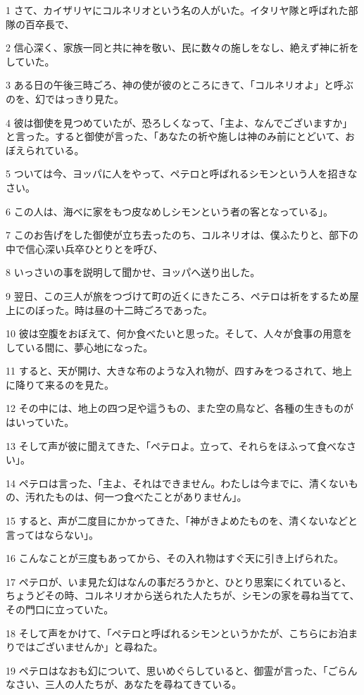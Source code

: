 \par 1 さて、カイザリヤにコルネリオという名の人がいた。イタリヤ隊と呼ばれた部隊の百卒長で、
\par 2 信心深く、家族一同と共に神を敬い、民に数々の施しをなし、絶えず神に祈をしていた。
\par 3 ある日の午後三時ごろ、神の使が彼のところにきて、「コルネリオよ」と呼ぶのを、幻ではっきり見た。
\par 4 彼は御使を見つめていたが、恐ろしくなって、「主よ、なんでございますか」と言った。すると御使が言った、「あなたの祈や施しは神のみ前にとどいて、おぼえられている。
\par 5 ついては今、ヨッパに人をやって、ペテロと呼ばれるシモンという人を招きなさい。
\par 6 この人は、海べに家をもつ皮なめしシモンという者の客となっている」。
\par 7 このお告げをした御使が立ち去ったのち、コルネリオは、僕ふたりと、部下の中で信心深い兵卒ひとりとを呼び、
\par 8 いっさいの事を説明して聞かせ、ヨッパへ送り出した。
\par 9 翌日、この三人が旅をつづけて町の近くにきたころ、ペテロは祈をするため屋上にのぼった。時は昼の十二時ごろであった。
\par 10 彼は空腹をおぼえて、何か食べたいと思った。そして、人々が食事の用意をしている間に、夢心地になった。
\par 11 すると、天が開け、大きな布のような入れ物が、四すみをつるされて、地上に降りて来るのを見た。
\par 12 その中には、地上の四つ足や這うもの、また空の鳥など、各種の生きものがはいっていた。
\par 13 そして声が彼に聞えてきた、「ペテロよ。立って、それらをほふって食べなさい」。
\par 14 ペテロは言った、「主よ、それはできません。わたしは今までに、清くないもの、汚れたものは、何一つ食べたことがありません」。
\par 15 すると、声が二度目にかかってきた、「神がきよめたものを、清くないなどと言ってはならない」。
\par 16 こんなことが三度もあってから、その入れ物はすぐ天に引き上げられた。
\par 17 ペテロが、いま見た幻はなんの事だろうかと、ひとり思案にくれていると、ちょうどその時、コルネリオから送られた人たちが、シモンの家を尋ね当てて、その門口に立っていた。
\par 18 そして声をかけて、「ペテロと呼ばれるシモンというかたが、こちらにお泊まりではございませんか」と尋ねた。
\par 19 ペテロはなおも幻について、思いめぐらしていると、御霊が言った、「ごらんなさい、三人の人たちが、あなたを尋ねてきている。
